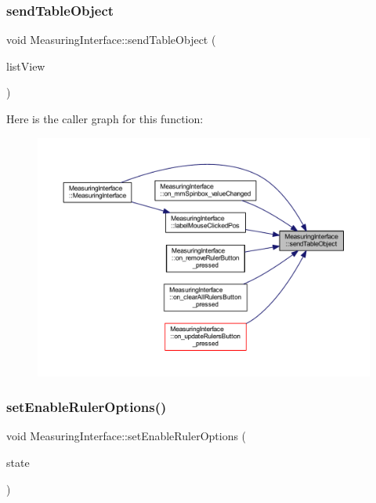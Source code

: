 \subsubsection{\texorpdfstring{sendTableObject}{sendTableObject}}
{\footnotesize\ttfamily void Measuring\+Interface\+::send\+Table\+Object (\begin{DoxyParamCaption}\item[{Q\+Table\+View \&}]{list\+View }\end{DoxyParamCaption})\hspace{0.3cm}{\ttfamily [signal]}}

Here is the caller graph for this function\+:
\nopagebreak
\begin{figure}[H]
\begin{center}
\leavevmode
\includegraphics[width=350pt]{class_measuring_interface_a1c458529cab62e1c2aa540107aa5285a_icgraph}
\end{center}
\end{figure}
\mbox{\label{class_measuring_interface_acf541a942e47266c30a8d473de4aca98}} 
\subsubsection{\texorpdfstring{setEnableRulerOptions()}{setEnableRulerOptions()}}
{\footnotesize\ttfamily void Measuring\+Interface\+::set\+Enable\+Ruler\+Options (\begin{DoxyParamCaption}\item[{bool}]{state }\end{DoxyParamCaption})\hspace{0.3cm}{\ttfamily [private]}}



